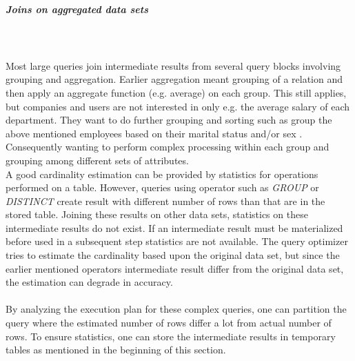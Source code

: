 \documentclass{cslthse-msc}
\begin{document}
\subparagraph{Joins on aggregated data sets}\mbox{}\\\\
Most large queries join intermediate results from several query blocks involving grouping and aggregation. Earlier aggregation meant grouping of a relation and then apply an aggregate function (e.g. average) on each group. This still applies, but companies and users are not interested in only e.g. the average salary of each department. They want to do further grouping and sorting such as group the above mentioned employees based on their marital status and/or sex   \cite{partioned}. Consequently wanting to perform complex processing within each group and grouping among different sets of attributes.\\ A good cardinality estimation can be provided by statistics for operations performed on a table. However, queries using operator such as \textit{GROUP} or \textit{DISTINCT} create result with different number of rows than that are in the stored table. Joining these results on other data sets, statistics on these intermediate results do not exist. If an intermediate result must be materialized before used in a subsequent step statistics are not available. The query optimizer tries to estimate the cardinality based upon the original data set, but since the earlier mentioned operators intermediate result differ from the original data set, the estimation can degrade in accuracy.\\\\ By analyzing the execution plan for these complex queries, one can partition the query where the estimated number of rows differ a lot from actual number of rows. To ensure statistics, one can store the intermediate results in temporary tables as mentioned in the beginning of this section.     
\end{document}
